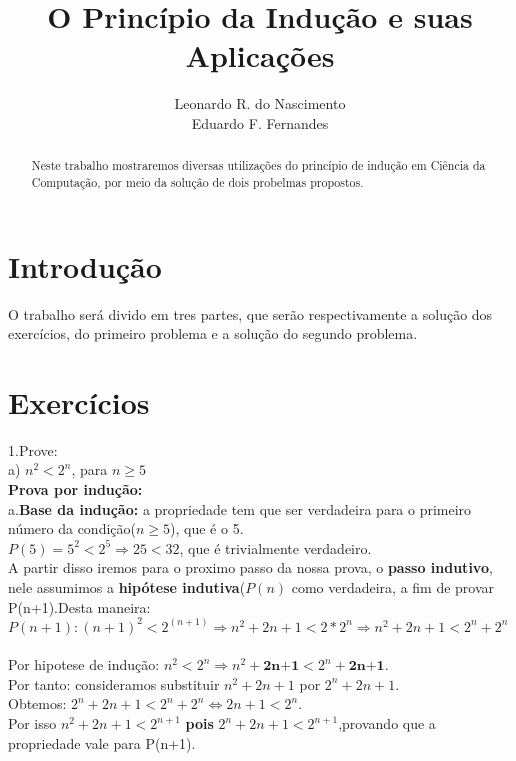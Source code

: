 \documentclass[a4paper, 10pt]{article}
\title{\LARGE \bf
O Princípio da Indução e suas Aplicações
}
\author{Leonardo R. do Nascimento\\ Eduardo F. Fernandes}
\begin{document}
\maketitle

\begin{abstract}

Neste trabalho mostraremos diversas utilizações do princípio de indução em Ciência da Computação, por meio da solução de dois probelmas propostos.

\end{abstract}

\section{Introdução}

O trabalho será divido em tres partes, que serão respectivamente a solução dos exercícios, do primeiro problema e a solução do segundo problema. 

\section{Exercícios}
1.Prove: \\
a) $n^2 < 2^n$, para $n \geq 5$ \\
\textbf{Prova por indução:} \\
a.\textbf{Base da indução:} a propriedade tem que ser verdadeira para o primeiro número da condição($n \geq 5$), que é o 5. \\

$P(5) = 5^2 < 2^5 \Longrightarrow{} 25 < 32$, que é trivialmente verdadeiro.\checkmark \\

\noindent A partir disso iremos para o proximo passo da nossa prova, o \textbf{passo indutivo}, nele assumimos a \textbf{hipótese indutiva}($P(n)$ como verdadeira, a fim de provar P(n+1).Desta maneira: \\

$P(n+1): (n+1)^2 < 2^{(n+1)} \Longrightarrow n^2+2n+1 < 2*2^n \Longrightarrow n^2+2n+1<2^n + 2^n$ \\ \\
Por hipotese de indução: $n^2 < 2^n \Longrightarrow n^2 + \textbf{2n+1} < 2^n + \textbf{2n+1}$. \\
Por tanto: consideramos substituir $n^2+2n+1$ por $2^n+2n+1$.  \\
Obtemos: $2^n+2n+1 < 2^n+2^n \Longleftrightarrow 2n+1 < 2^n$.  \\
Por isso  $n^2+2n+1  < 2^{n+1}$ \textbf{pois} $2^n+2n+1  < 2^{n+1} $,provando que a propriedade vale para P(n+1).\checkmark\\ 
\end{document}
